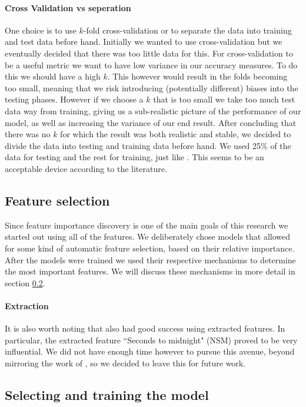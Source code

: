 \documentclass[british]{article}
\begin{document}
	\paragraph{Cross Validation vs seperation} One choice is to use $k$-fold cross-validation or to separate the data into training and test data before hand. Initially we wanted to use cross-validation but we eventually decided that there was too little data for this. For cross-validation to be a useful metric we want to have low variance in our accuracy measures. To do this we should have a high $k$. This however would result in the folds becoming too small, meaning that we risk introducing (potentially different) biases into the testing phases. However if we choose a $k$ that is too small we take too much test data way from training, giving us a sub-realistic picture of the performance of our model, as well as increasing the variance of our end result. After concluding that there was no $k$ for which the result was both realistic and stable, we decided to divide the data into testing and training data before hand. We used 25\% of the data for testing and the rest for training, just like \citeauthor{Candanedo2017}. This seems to be an acceptable device according to the literature. 
	
	\subsection{Feature selection}
	\label{featureSelection}
	Since feature importance discovery is one of the main goals of this research we started out using all of the features. We deliberately chose models that allowed for some kind of automatic feature selection, based on their relative importance. After the models were trained we used their respective mechanisms to determine the most important features. We will discuss these mechanisms in more detail in section \ref{modelSelection}.
	
	\paragraph{Extraction} It is also worth noting that \citeauthor{Willmott2009} also had good success using extracted features. In particular, the extracted feature ``Seconds to midnight" (NSM) proved to be very influential. We did not have enough time however to pursue this avenue, beyond mirroring the work of  \autocite{Candanedo2017}, so we decided to leave this for future work. 
	
	\subsection{Selecting and training the model}
	\label{modelSelection}
\end{document}
